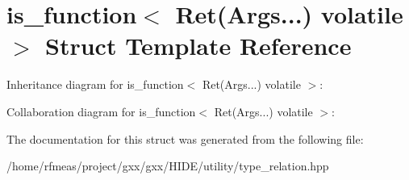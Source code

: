 \hypertarget{structis__function_3_01Ret_07Args_8_8_8_08_01volatile_01_4}{}\section{is\+\_\+function$<$ Ret(Args...) volatile $>$ Struct Template Reference}
\label{structis__function_3_01Ret_07Args_8_8_8_08_01volatile_01_4}


Inheritance diagram for is\+\_\+function$<$ Ret(Args...) volatile $>$\+:


Collaboration diagram for is\+\_\+function$<$ Ret(Args...) volatile $>$\+:


The documentation for this struct was generated from the following file\+:\begin{DoxyCompactItemize}
\item 
/home/rfmeas/project/gxx/gxx/\+H\+I\+D\+E/utility/type\+\_\+relation.\+hpp\end{DoxyCompactItemize}

